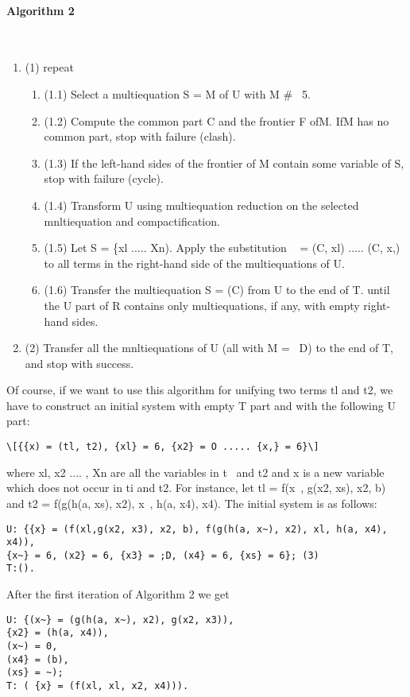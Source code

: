 \paragraph{Algorithm 2}\ \\
\begin{enumerate}
  \item 
(1) repeat
\begin{enumerate}
  \item 
(1.1) Select a multiequation S = M of U with M \# ~5.
  \item 
(1.2) Compute the common part C and the frontier F ofM. IfM has no common part,
stop with failure (clash).
  \item 
(1.3) If the left-hand sides of the frontier of M contain some variable of S, stop with
failure (cycle).
  \item 
(1.4) Transform U using multiequation reduction on the selected mnltiequation and
compactification.
  \item 
(1.5) Let S = \{xl ..... Xn). Apply the substitution ~ = {(C, xl) ..... (C, x,)}
to all terms in the right-hand side of the multiequations of U.
  \item 
(1.6) Transfer the multiequation S = (C) from U to the end of T.
until the U part of R contains only multiequations, if any, with empty right-hand
sides.
\end{enumerate}
  \item 
(2) Transfer all the mnltiequations of U (all with M = ~D) to the end of T, and stop with
success. 
\end{enumerate}
 
Of course, if we want to use this algorithm for unifying two terms tl and t2, we
have to construct an initial system with empty T part and with the following U
part:
\begin{verbatim}
\[{{x) = (tl, t2), {xl} = 6, {x2} = O ..... {x,} = 6}\]
\end{verbatim}
where xl, x2 .... , Xn are all the variables in t~ and t2 and x is a new variable which
does not occur in ti and t2. For instance, let tl = f(x~, g(x2, xs), x2, b) and
t2 = f(g(h(a, xs), x2), x~, h(a, x4), x4). The initial system is as follows:
\begin{verbatim}
U: {{x} = (f(xl,g(x2, x3), x2, b), f(g(h(a, x~), x2), xl, h(a, x4), x4)),
{x~} = 6, (x2} = 6, {x3} = ;D, (x4} = 6, {xs} = 6}; (3)
T:().  
\end{verbatim}

After the first iteration of Algorithm 2 we get
\begin{verbatim}
U: {(x~} = (g(h(a, x~), x2), g(x2, x3)),
{x2} = (h(a, x4)),
(x~) = 0,
(x4} = (b),
(xs} = ~);
T: ( {x} = (f(xl, xl, x2, x4))). 
\end{verbatim}

